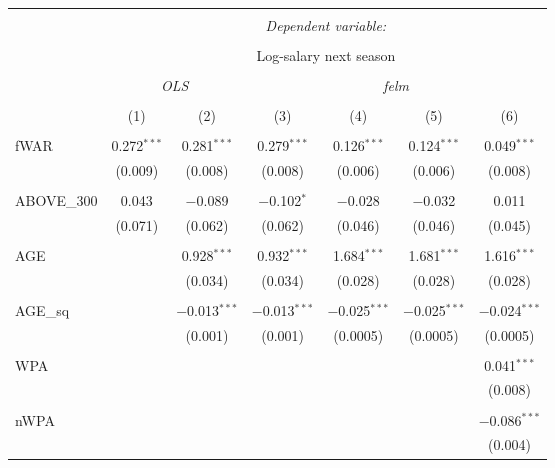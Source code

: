 
\begin{table}[!htbp] \centering
  \caption{}
  \label{}
  \scriptsize
\begin{tabular}{@{\extracolsep{5pt}}lcccccc}
\\[-1.8ex]\hline
\hline \\[-1.8ex]
 & \multicolumn{6}{c}{\textit{Dependent variable:}} \\
\cline{2-7}
\\[-1.8ex] & \multicolumn{6}{c}{Log-salary next season} \\
\\[-1.8ex] & \multicolumn{2}{c}{\textit{OLS}} & \multicolumn{4}{c}{\textit{felm}} \\
\\[-1.8ex] & (1) & (2) & (3) & (4) & (5) & (6)\\
\hline \\[-1.8ex]
 fWAR & 0.272$^{***}$ & 0.281$^{***}$ & 0.279$^{***}$ & 0.126$^{***}$ & 0.124$^{***}$ & 0.049$^{***}$ \\
  & (0.009) & (0.008) & (0.008) & (0.006) & (0.006) & (0.008) \\
  & & & & & & \\
 ABOVE\_300 & 0.043 & $-$0.089 & $-$0.102$^{*}$ & $-$0.028 & $-$0.032 & 0.011 \\
  & (0.071) & (0.062) & (0.062) & (0.046) & (0.046) & (0.045) \\
  & & & & & & \\
 AGE &  & 0.928$^{***}$ & 0.932$^{***}$ & 1.684$^{***}$ & 1.681$^{***}$ & 1.616$^{***}$ \\
  &  & (0.034) & (0.034) & (0.028) & (0.028) & (0.028) \\
  & & & & & & \\
 AGE\_sq &  & $-$0.013$^{***}$ & $-$0.013$^{***}$ & $-$0.025$^{***}$ & $-$0.025$^{***}$ & $-$0.024$^{***}$ \\
  &  & (0.001) & (0.001) & (0.0005) & (0.0005) & (0.0005) \\
  & & & & & & \\
 WPA &  &  &  &  &  & 0.041$^{***}$ \\
  &  &  &  &  &  & (0.008) \\
  & & & & & & \\
 nWPA &  &  &  &  &  & $-$0.086$^{***}$ \\
  &  &  &  &  &  & (0.004) \\

\end{tabular}
\end{table}
